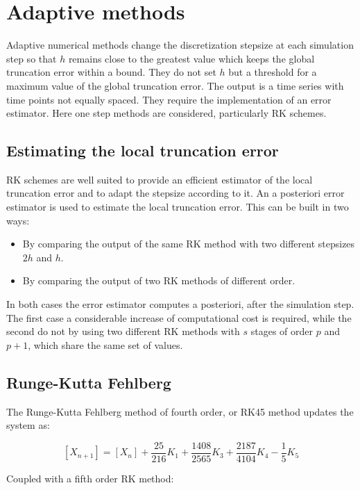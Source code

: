 \section{Adaptive methods}
Adaptive numerical methods change the discretization stepsize at each simulation step so that $h$ remains close to the greatest value which keeps the global truncation error within a bound.
They do not set $h$ but a threshold for a maximum value of the global truncation error.
The output is a time series with time points not equally spaced.
They require the implementation of an error estimator.
Here one step methods are considered, particularly RK schemes.

  \subsection{Estimating the local truncation error}
  RK schemes are well suited to provide an efficient estimator of the local truncation error and to adapt the stepsize according to it.
  An a posteriori error estimator is used to estimate the local truncation error.
  This can be built in two ways:

  \begin{multicols}{2}
    \begin{itemize}
      \item By comparing the output of the same RK method with two different stepsizes $2h$ and $h$.
      \item By comparing the output of two RK methods of different order.
    \end{itemize}
  \end{multicols}

  In both cases the error estimator computes a posteriori, after the simulation step.
  The first case a considerable increase of computational cost is required, while the second do not by using two different RK methods with $s$ stages of order $p$ and $p+1$, which share the same set of values.

  \subsection{Runge-Kutta Fehlberg}
  The Runge-Kutta Fehlberg method of fourth order, or RK45 method updates the system as:

  $$[X_{n+1}] = [X_n] + \frac{25}{216}K_1+\frac{1408}{2565}K_3+\frac{2187}{4104}K_4-\frac{1}{5}K_5$$

  Coupled with a fifth order RK method:

